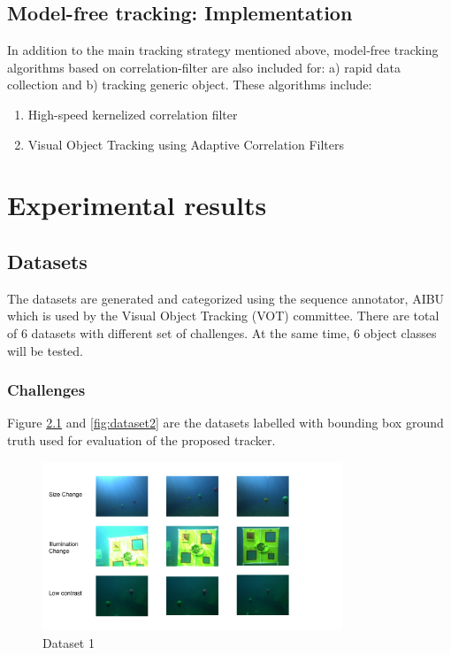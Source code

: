 \documentclass[hyp]{socreport}
\begin{document}
\section{Model-free tracking: Implementation}

In addition to the main tracking strategy mentioned above, model-free tracking algorithms
based on correlation-filter are also included for: a) rapid data collection and
b) tracking generic object. These algorithms include:

\begin{enumerate}
  \item High-speed kernelized correlation filter 
  \item Visual Object Tracking using Adaptive Correlation Filters 
\end{enumerate}


\chapter{Experimental results}

\section{Datasets}

The datasets are generated and categorized using the sequence annotator, AIBU
which is used by the Visual Object Tracking (VOT) committee. There are total of
6 datasets with different set of challenges. At the same time, 6 object classes
will be tested.

\subsection{Challenges}

Figure \ref{fig:dataset1} and \ref{fig:dataset2} are the datasets labelled with
bounding box ground truth used for evaluation of the proposed tracker.

\begin{figure}[H]
\centering
  \includegraphics[width=0.8\textwidth, height=0.3\textheight]{data1.png}
  \caption{Dataset 1}
  \label{fig:dataset1}
\end{figure}
\end{document}

